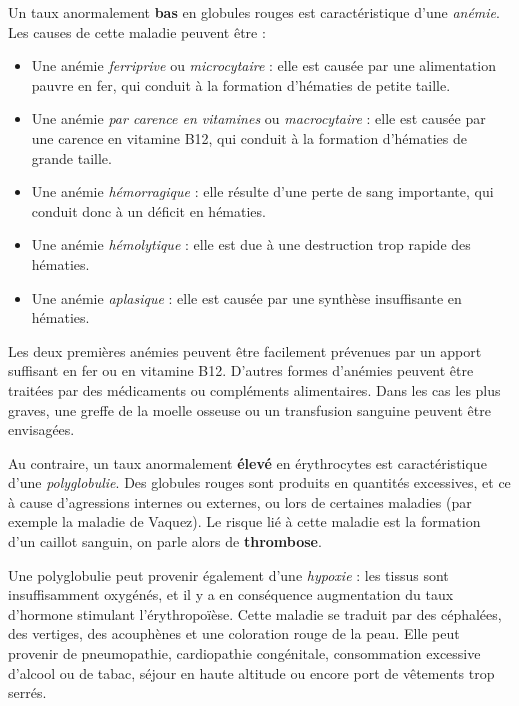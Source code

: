 \documentclass[12pt]{article}
\begin{document}
	Un taux anormalement \textbf{bas} en globules rouges est caractéristique d'une \textit{anémie}. Les causes de cette maladie peuvent être :
	\begin{itemize}
	\item Une anémie \textit{ferriprive} ou \textit{microcytaire} : elle est causée par une alimentation pauvre en fer, qui conduit à la formation d'hématies de petite taille.
	\item Une anémie \textit{par carence en vitamines} ou \textit{macrocytaire} : elle est causée par une carence en vitamine B12, qui conduit à la formation d'hématies de grande taille.
	\item Une anémie \textit{hémorragique} : elle résulte d'une perte de sang importante, qui conduit donc à un déficit en hématies.
	\item Une anémie \textit{hémolytique} : elle est due à une destruction trop rapide des hématies.
	\item Une anémie \textit{aplasique} : elle est causée par une synthèse insuffisante en hématies.
	\end{itemize}
	Les deux premières anémies peuvent être facilement prévenues par un apport suffisant en fer ou en vitamine B12. D'autres formes d'anémies peuvent être traitées par des médicaments ou compléments alimentaires. Dans les cas les plus graves, une greffe de la moelle osseuse ou un transfusion sanguine peuvent être envisagées.
	
	Au contraire, un taux anormalement \textbf{élevé} en érythrocytes est caractéristique d'une \textit{polyglobulie}. Des globules rouges sont produits en quantités excessives, et ce à cause d'agressions internes ou externes, ou lors de certaines maladies (par exemple la maladie de Vaquez). Le risque lié à cette maladie est la formation d'un caillot sanguin, on parle alors de \textbf{thrombose}.
	
	Une polyglobulie peut provenir également d'une \textit{hypoxie} : les tissus sont insuffisamment oxygénés, et il y a en conséquence augmentation du taux d'hormone stimulant l'érythropoïèse. Cette maladie se traduit par des céphalées, des vertiges, des acouphènes et une coloration rouge de la peau. Elle peut provenir de pneumopathie, cardiopathie congénitale, consommation excessive d'alcool ou de tabac, séjour en haute altitude ou encore port de vêtements trop serrés.
	
\end{document}
